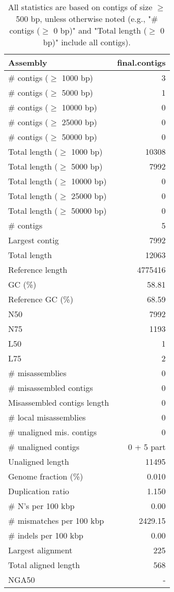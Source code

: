 \documentclass[12pt,a4paper]{article}
\begin{document}
\begin{table}[ht]
\begin{center}
\caption{All statistics are based on contigs of size $\geq$ 500 bp, unless otherwise noted (e.g., "\# contigs ($\geq$ 0 bp)" and "Total length ($\geq$ 0 bp)" include all contigs).}
\begin{tabular}{|l*{1}{|r}|}
\hline
Assembly & final.contigs \\ \hline
\# contigs ($\geq$ 1000 bp) & 3 \\ \hline
\# contigs ($\geq$ 5000 bp) & 1 \\ \hline
\# contigs ($\geq$ 10000 bp) & 0 \\ \hline
\# contigs ($\geq$ 25000 bp) & 0 \\ \hline
\# contigs ($\geq$ 50000 bp) & 0 \\ \hline
Total length ($\geq$ 1000 bp) & 10308 \\ \hline
Total length ($\geq$ 5000 bp) & 7992 \\ \hline
Total length ($\geq$ 10000 bp) & 0 \\ \hline
Total length ($\geq$ 25000 bp) & 0 \\ \hline
Total length ($\geq$ 50000 bp) & 0 \\ \hline
\# contigs & 5 \\ \hline
Largest contig & 7992 \\ \hline
Total length & 12063 \\ \hline
Reference length & 4775416 \\ \hline
GC (\%) & 58.81 \\ \hline
Reference GC (\%) & 68.59 \\ \hline
N50 & 7992 \\ \hline
N75 & 1193 \\ \hline
L50 & 1 \\ \hline
L75 & 2 \\ \hline
\# misassemblies & 0 \\ \hline
\# misassembled contigs & 0 \\ \hline
Misassembled contigs length & 0 \\ \hline
\# local misassemblies & 0 \\ \hline
\# unaligned mis. contigs & 0 \\ \hline
\# unaligned contigs & 0 + 5 part \\ \hline
Unaligned length & 11495 \\ \hline
Genome fraction (\%) & 0.010 \\ \hline
Duplication ratio & 1.150 \\ \hline
\# N's per 100 kbp & 0.00 \\ \hline
\# mismatches per 100 kbp & 2429.15 \\ \hline
\# indels per 100 kbp & 0.00 \\ \hline
Largest alignment & 225 \\ \hline
Total aligned length & 568 \\ \hline
NGA50 & - \\ \hline
\end{tabular}
\end{center}
\end{table}
\end{document}
